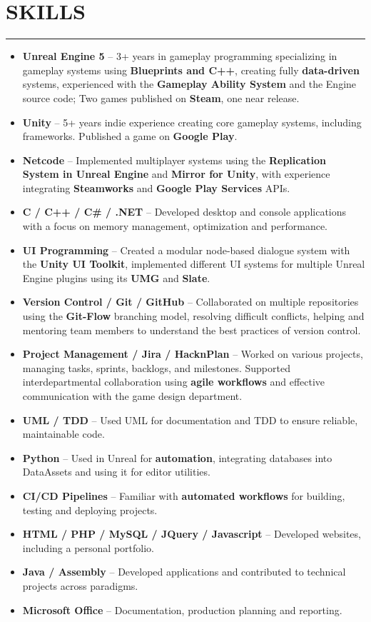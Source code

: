 \documentclass[7pt]{article}
\newcommand{\sectionline}{\vspace{-0.3em}\noindent\rule{\linewidth}{0.15pt}\vspace{0.08em}}
\newcommand{\cvsection}[2]{%
    \vspace{-.6em}
    \section*{{\large\textbf{\MakeUppercase{#1}}}}
    \vspace{-0.5em}
    \sectionline
    \vspace{-0.15em}
    #2
}
\begin{document}
    \cvsection{SKILLS}{
        \begin{itemize}[noitemsep, topsep=0pt, parsep=0pt, partopsep=0pt, itemsep=0pt, leftmargin=*]
            \item \textbf{Unreal Engine 5} – 3+ years in gameplay programming specializing in gameplay systems using \textbf{Blueprints and C++}, creating fully \textbf{data-driven} systems,  experienced with the \textbf{Gameplay Ability System} and the Engine source code; Two games published on \textbf{Steam}, one near release.
            \item \textbf{Unity} – 5+ years indie experience creating core gameplay systems, including frameworks. Published a game on \textbf{Google Play}.
            \item \textbf{Netcode} – Implemented multiplayer systems using the \textbf{Replication System in Unreal Engine} and \textbf{Mirror for Unity}, with experience integrating \textbf{Steamworks} and \textbf{Google Play Services} APIs.
            \item \textbf{C / C++ / C\# / .NET} – Developed desktop and console applications with a focus on memory management, optimization and performance.
            \item \textbf{UI Programming} – Created a modular node-based dialogue system with the \textbf{Unity UI Toolkit}, implemented different UI systems for multiple Unreal Engine plugins using its \textbf{UMG} and \textbf{Slate}.
            \item \textbf{Version Control / Git / GitHub} – Collaborated on multiple repositories using the \textbf{Git-Flow} branching model, resolving difficult conflicts, helping and mentoring team members to understand the best practices of version control.
            \item \textbf{Project Management / Jira / HacknPlan} – Worked on various projects, managing tasks, sprints, backlogs, and milestones. Supported interdepartmental collaboration using \textbf{agile workflows} and effective communication with the game design department.
            \item \textbf{UML / TDD} – Used UML for documentation and TDD to ensure reliable, maintainable code.
            \item \textbf{Python} – Used in Unreal for \textbf{automation}, integrating databases into DataAssets and using it for editor utilities.
            \item \textbf{CI/CD Pipelines} – Familiar with \textbf{automated workflows} for building, testing and deploying projects.
            \item \textbf{HTML / PHP / MySQL / JQuery / Javascript} – Developed websites, including a personal portfolio.
            \item \textbf{Java / Assembly} – Developed applications and contributed to technical projects across paradigms.
            \item \textbf{Microsoft Office} – Documentation, production planning and reporting.
        \end{itemize}
    }
\end{document}
